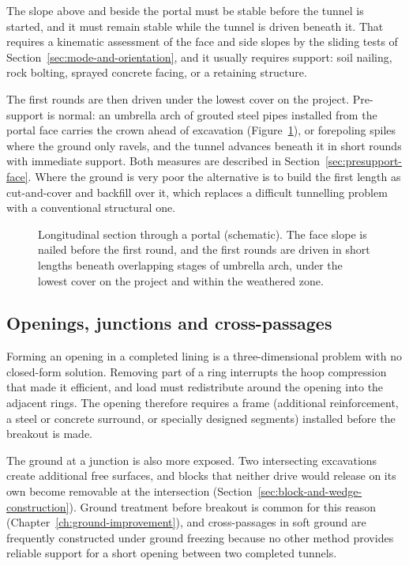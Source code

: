 The slope above and beside the portal must be stable before the tunnel is
started, and it must remain stable while the tunnel is driven beneath it. That
requires a kinematic assessment of the face and side slopes by the sliding
tests of Section~\ref{sec:mode-and-orientation}, and it usually requires support: soil
nailing, rock bolting, sprayed concrete facing, or a retaining structure.

The first rounds are then driven under the lowest cover on the project.
Pre-support is normal: an umbrella arch of grouted steel pipes installed from
the portal face carries the crown ahead of excavation
(Figure~\ref{fig:portal-section}), or forepoling spiles where the ground
only ravels, and the tunnel advances beneath it in short rounds with
immediate support. Both measures are described in
Section~\ref{sec:presupport-face}.
Where the ground is very poor the alternative is to build the first length as
cut-and-cover and backfill over it, which replaces a difficult tunnelling
problem with a conventional structural one.

\begin{figure}[htbp]
\centering
{}
\caption{Longitudinal section through a portal (schematic). The face slope is nailed before the first round, and the first rounds are driven in short lengths beneath overlapping stages of umbrella arch, under the lowest cover on the project and within the weathered zone.}
\label{fig:portal-section}
\end{figure}

\subsection{Openings, junctions and cross-passages}
\label{sec:junctions}

Forming an opening in a completed lining is a three-dimensional problem with
no closed-form solution. Removing part of a ring interrupts the hoop
compression that made it efficient, and load must redistribute around the
opening into the adjacent rings. The opening therefore requires a frame
(additional reinforcement, a steel or concrete surround, or specially designed
segments) installed before the breakout is made.

The ground at a junction is also more exposed. Two intersecting excavations
create additional free surfaces, and blocks that neither drive would release
on its own become removable at the intersection (Section~\ref{sec:block-and-wedge-construction}). Ground treatment before
breakout is common for this reason (Chapter~\ref{ch:ground-improvement}),
and cross-passages in soft ground
are frequently constructed under ground freezing because no other method
provides reliable support for a short opening between two completed tunnels.

